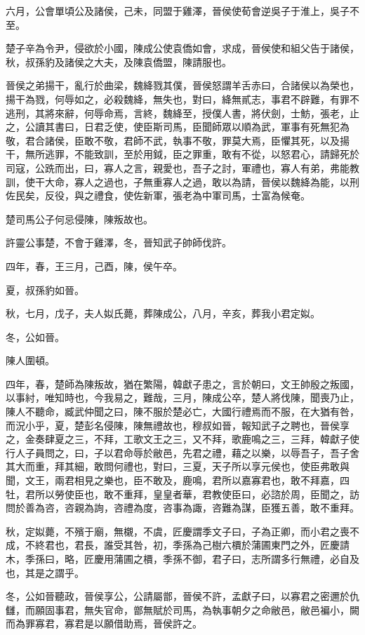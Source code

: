 \begin{pinyinscope}
六月，公會單頃公及諸侯，己未，同盟于雞澤，晉侯使荀會逆吳子于淮上，吳子不至。

楚子辛為令尹，侵欲於小國，陳成公使袁僑如會，求成，晉侯使和組父告于諸侯，秋，叔孫豹及諸侯之大夫，及陳袁僑盟，陳請服也。

晉侯之弟揚干，亂行於曲梁，魏絳戮其僕，晉侯怒謂羊舌赤曰，合諸侯以為榮也，揚干為戮，何辱如之，必殺魏絳，無失也，對曰，絳無貳志，事君不辟難，有罪不逃刑，其將來辭，何辱命焉，言終，魏絳至，授僕人書，將伏劍，士魴，張老，止之，公讀其書曰，日君乏使，使臣斯司馬，臣聞師眾以順為武，軍事有死無犯為敬，君合諸侯，臣敢不敬，君師不武，執事不敬，罪莫大焉，臣懼其死，以及揚干，無所逃罪，不能致訓，至於用鉞，臣之罪重，敢有不從，以怒君心，請歸死於司寇，公跣而出，曰，寡人之言，親愛也，吾子之討，軍禮也，寡人有弟，弗能教訓，使干大命，寡人之過也，子無重寡人之過，敢以為請，晉侯以魏絳為能，以刑佐民矣，反役，與之禮食，使佐新軍，張老為中軍司馬，士富為候奄。

楚司馬公子何忌侵陳，陳叛故也。

許靈公事楚，不會于雞澤，冬，晉知武子帥師伐許。

四年，春，王三月，己酉，陳，侯午卒。

夏，叔孫豹如晉。

秋，七月，戊子，夫人姒氏薨，葬陳成公，八月，辛亥，葬我小君定姒。

冬，公如晉。

陳人圍頓。

四年，春，楚師為陳叛故，猶在繁陽，韓獻子患之，言於朝曰，文王帥殷之叛國，以事紂，唯知時也，今我易之，難哉，三月，陳成公卒，楚人將伐陳，聞喪乃止，陳人不聽命，臧武仲聞之曰，陳不服於楚必亡，大國行禮焉而不服，在大猶有咎，而況小乎，夏，楚彭名侵陳，陳無禮故也，穆叔如晉，報知武子之聘也，晉侯享之，金奏肆夏之三，不拜，工歌文王之三，又不拜，歌鹿鳴之三，三拜，韓獻子使行人子員問之，曰，子以君命辱於敝邑，先君之禮，藉之以樂，以辱吾子，吾子舍其大而重，拜其細，敢問何禮也，對曰，三夏，天子所以享元侯也，使臣弗敢與聞，文王，兩君相見之樂也，臣不敢及，鹿鳴，君所以嘉寡君也，敢不拜嘉，四牡，君所以勞使臣也，敢不重拜，皇皇者華，君教使臣曰，必諮於周，臣聞之，訪問於善為咨，咨親為詢，咨禮為度，咨事為諏，咨難為謀，臣獲五善，敢不重拜。

秋，定姒薨，不殯于廟，無櫬，不虞，匠慶謂季文子曰，子為正卿，而小君之喪不成，不終君也，君長，誰受其咎，初，季孫為己樹六檟於蒲圃東門之外，匠慶請木，季孫曰，略，匠慶用蒲圃之檟，季孫不御，君子曰，志所謂多行無禮，必自及也，其是之謂乎。

冬，公如晉聽政，晉侯享公，公請屬鄫，晉侯不許，孟獻子曰，以寡君之密邇於仇讎，而願固事君，無失官命，鄫無賦於司馬，為執事朝夕之命敝邑，敝邑褊小，闕而為罪寡君，寡君是以願借助焉，晉侯許之。


\end{pinyinscope}
